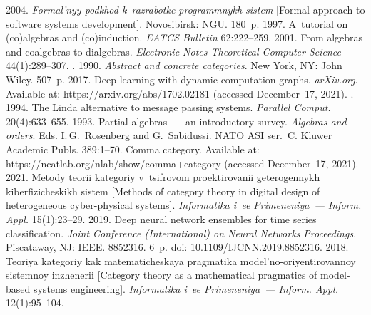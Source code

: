 \begin{multicols}{2}
{{\begin{thebibliography}{99}
    2004. \textit{Formal'nyy podkhod k~razrabotke programmnykh sistem} 
[Formal approach to software systems development]. Novosibirsk: NGU. 180~p.
    1997. A~tutorial on (co)algebras and (co)induction. 
\textit{EATCS Bulletin} 62:222--259.
    2001. From algebras and coalgebras to dialgebras. 
\textit{Electronic Notes Theoretical Computer Science} 44(1):289--307.
   . 1990. \textit{Abstract 
and concrete categories}. New York, NY: John Wiley. 507~p.
    2017. Deep learning with 
dynamic computation graphs. \textit{arXiv.org}. Available at: {\sf 
https://arxiv.org/abs/1702.02181} (accessed December~17, 2021).
   . 1994. The Linda 
alternative to message passing systems. \textit{Parallel Comput.} 20(4):633--655.
    1993. Partial algebras~--- an introductory survey. \textit{Algebras and 
orders}. Eds. I.\,G.~Rosenberg and G.~Sabidussi. NATO ASI ser.~C. 
Kluwer Academic Publs. 389:1--70.
   Comma category. Available at: {\sf https://ncatlab.org/nlab/\linebreak show/comma+category} (accessed 
December~17, 2021).
    2021. Metody teorii kategoriy v~tsifrovom proektirovanii 
geterogennykh kiberfizicheskikh sistem [Methods of category theory in digital design of 
heterogeneous cyber-physical systems]. \textit{Informatika i~ee Primeneniya~--- Inform. Appl.} 
15(1):23--29.
    2019. Deep neural 
network ensembles for time series classification. \textit{Joint Conference (International) on Neural 
Networks Proceedings}. Piscataway, NJ: IEEE. 8852316. 6~p. doi: 10.1109/IJCNN.2019.8852316.
    2018. Teoriya kategoriy kak ma\-te\-ma\-ti\-che\-skaya pragmatika  
model'no-oriyentirovannoy sistemnoy inzhenerii [Category theory as a mathematical pragmatics of 
model-based systems engineering]. \textit{Informatika i~ee Primeneniya~--- Inform. Appl.} 
12(1):95--104.

\end{thebibliography}

 }
 }

\end{multicols}

